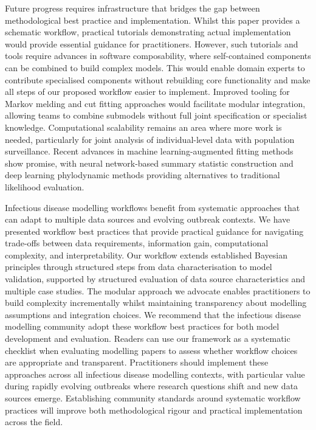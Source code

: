 \documentclass{article}
\begin{document}
Future progress requires infrastructure that bridges the gap between methodological best practice and implementation.
Whilst this paper provides a schematic workflow, practical tutorials demonstrating actual implementation would provide essential guidance for practitioners.
However, such tutorials and tools require advances in software composability, where self-contained components can be combined to build complex models.
This would enable domain experts to contribute specialised components without rebuilding core functionality and make all steps of our proposed workflow easier to implement.
Improved tooling for Markov melding and cut fitting approaches would facilitate modular integration, allowing teams to combine submodels without full joint specification or specialist knowledge.
Computational scalability remains an area where more work is needed, particularly for joint analysis of individual-level data with population surveillance.
Recent advances in machine learning-augmented fitting methods show promise, with neural network-based summary statistic construction \citep{raynal2019abc} and deep learning phylodynamic methods \citep{voznica2022deep} providing alternatives to traditional likelihood evaluation.


Infectious disease modelling workflows benefit from systematic approaches that can adapt to multiple data sources and evolving outbreak contexts.
We have presented workflow best practices that provide practical guidance for navigating trade-offs between data requirements, information gain, computational complexity, and interpretability.
Our workflow extends established Bayesian principles through structured steps from data characterisation to model validation, supported by structured evaluation of data source characteristics and multiple case studies.
The modular approach we advocate enables practitioners to build complexity incrementally whilst maintaining transparency about modelling assumptions and integration choices.
We recommend that the infectious disease modelling community adopt these workflow best practices for both model development and evaluation.
Readers can use our framework as a systematic checklist when evaluating modelling papers to assess whether workflow choices are appropriate and transparent.
Practitioners should implement these approaches across all infectious disease modelling contexts, with particular value during rapidly evolving outbreaks where research questions shift and new data sources emerge.
Establishing community standards around systematic workflow practices will improve both methodological rigour and practical implementation across the field.
\end{document}
